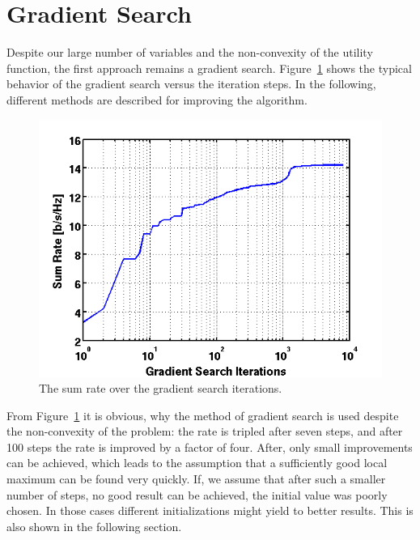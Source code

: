 \section{Gradient Search}
\label{sec:grads_solver}

Despite our large number of variables and the non-convexity of the utility function, the first approach remains a gradient search.
Figure~\ref{fig:grad_search} shows the typical behavior of the gradient search versus the iteration steps.
In the following, different methods are described for improving the algorithm.

\begin{figure}[h]
\centering
  \includegraphics[width=0.8\linewidth]{images/rvsgradCnt_7rel_18dB_6.png}
\caption{The sum rate over the gradient search iterations.}
\label{fig:grad_search}
\end{figure}

From Figure~\ref{fig:grad_search} it is obvious, why the method of gradient search is used despite the non-convexity of the problem:
the rate is tripled after seven steps, and after 100 steps the rate is improved by a factor of four.
After, only small improvements can be achieved, which leads to the assumption that a sufficiently good local maximum can be found very quickly.
If, we assume that after such a smaller number of steps, no good result can be achieved, the initial value was poorly chosen.
In those cases different initializations might yield to better results.
This is also shown in the following section.

